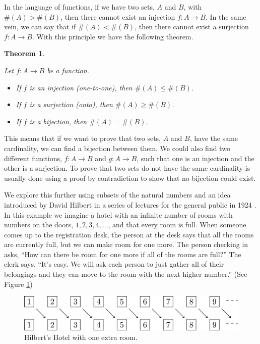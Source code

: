 \documentclass[
]{book}
\newtheorem{theorem}{Theorem}[chapter]
\theoremstyle{definition}
\theoremstyle{definition}
\theoremstyle{definition}
\theoremstyle{definition}
\theoremstyle{remark}
\begin{document}
In the language of functions, if we have two sets, \(A\) and \(B\), with \(\#(A)>\#(B)\), then there cannot exist an injection \(f:A\rightarrow B\). In the same vein, we can say that if \(\#(A) < \#(B)\), then there cannot exist a surjection \(f:A\rightarrow B\). With this principle we have the following theorem.

\begin{theorem}
\protect\hypertarget{thm:unlabeled-div-73}{}\label{thm:unlabeled-div-73}

Let \(f:A\rightarrow B\) be a function.

\begin{itemize}
\item
  If \(f\) is an injection (one-to-one), then \(\#(A)\leq \#(B)\).
\item
  If \(f\) is a surjection (onto), then \(\#(A)\geq \#(B)\).
\item
  If \(f\) is a bijection, then \(\#(A) = \#(B)\).
\end{itemize}

\end{theorem}

This means that if we want to prove that two sets, \(A\) and \(B\), have the same cardinality, we can find a bijection between them. We could also find two different functions, \(f:A\rightarrow B\) and \(g:A\rightarrow B\), such that one is an injection and the other is a surjection. To prove that two sets do not have the same cardinality is usually done using a proof by contradiction to show that no bijection could exist.

We explore this further using subsets of the natural numbers and an idea introduced by David Hilbert in a series of lectures for the general public in 1924 \citep{Hilbert}. In this example we imagine a hotel with an infinite number of rooms with numbers on the doors, \(1, 2, 3, 4, \ldots\), and that every room is full. When someone comes up to the registration desk, the person at the desk says that all the rooms are currently full, but we can make room for one more. The person checking in asks, ``How can there be room for one more if all of the rooms are full?'' The clerk says, ``It's easy. We will ask each person to just gather all of their belongings and they can move to the room with the next higher number.'' (See Figure \ref{fig:hilbert1})

\begin{figure}

{\centering \includegraphics[width=1\linewidth]{tikz/Hilbert-Hotel} 

}

\caption{Hilbert's Hotel with one extra room.}\label{fig:hilbert1}
\end{figure}
\end{document}

